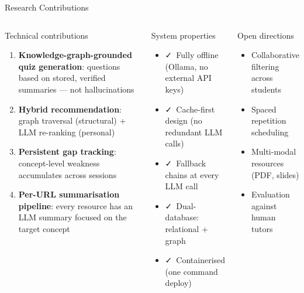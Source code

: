 \documentclass[aspectratio=169,12pt]{beamer}
\begin{document}
\begin{frame}{Research Contributions}
  \begin{columns}
      \begin{block}{Technical contributions}
        \begin{enumerate}\small
          \item \textbf{Knowledge-graph-grounded quiz generation}:
                questions based on stored, verified summaries — not hallucinations
          \item \textbf{Hybrid recommendation}:
                graph traversal (structural) + LLM re-ranking (personal)
          \item \textbf{Persistent gap tracking}:
                concept-level weakness accumulates across sessions
          \item \textbf{Per-URL summarisation pipeline}:
                every resource has an LLM summary focused on the target concept
        \end{enumerate}
      \end{block}
      \begin{block}{System properties}
        \begin{itemize}\small
          \item \textcolor{codegreen}{\faCheck}\ Fully offline (Ollama, no external API keys)
          \item \textcolor{codegreen}{\faCheck}\ Cache-first design (no redundant LLM calls)
          \item \textcolor{codegreen}{\faCheck}\ Fallback chains at every LLM call
          \item \textcolor{codegreen}{\faCheck}\ Dual-database: relational + graph
          \item \textcolor{codegreen}{\faCheck}\ Containerised (one command deploy)
        \end{itemize}
      \end{block}
      \begin{alertblock}{Open directions}
        \begin{itemize}\footnotesize
          \item Collaborative filtering across students
          \item Spaced repetition scheduling
          \item Multi-modal resources (PDF, slides)
          \item Evaluation against human tutors
        \end{itemize}
      \end{alertblock}
  \end{columns}
\end{frame}
\end{document}
